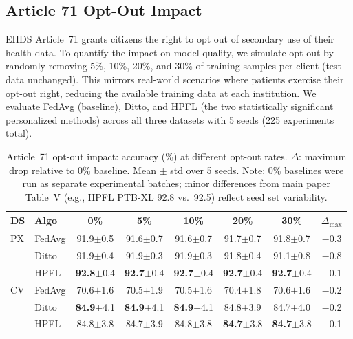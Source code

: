 \documentclass[conference]{IEEEtran}
\begin{document}
\subsection{Article 71 Opt-Out Impact}
\label{sec:optout}

EHDS Article~71 grants citizens the right to opt out of secondary use of their health data. To quantify the impact on model quality, we simulate opt-out by randomly removing 5\%, 10\%, 20\%, and 30\% of training samples per client (test data unchanged). This mirrors real-world scenarios where patients exercise their opt-out right, reducing the available training data at each institution. We evaluate FedAvg (baseline), Ditto, and HPFL (the two statistically significant personalized methods) across all three datasets with 5 seeds (225 experiments total).

\begin{table}[t]
\centering
\caption{Article~71 opt-out impact: accuracy (\%) at different opt-out rates. $\Delta$: maximum drop relative to 0\% baseline. Mean $\pm$ std over 5 seeds. Note: 0\% baselines were run as separate experimental batches; minor differences from main paper Table~V (e.g., HPFL PTB-XL 92.8 vs.\ 92.5) reflect seed set variability.}
\label{tab:optout}
\footnotesize
\begin{tabular}{ll ccccc c}
\toprule
\textbf{DS} & \textbf{Algo} & \textbf{0\%} & \textbf{5\%} & \textbf{10\%} & \textbf{20\%} & \textbf{30\%} & $\Delta_{\max}$ \\
\midrule
PX & FedAvg & 91.9{\tiny$\pm$0.5} & 91.6{\tiny$\pm$0.7} & 91.6{\tiny$\pm$0.7} & 91.7{\tiny$\pm$0.7} & 91.8{\tiny$\pm$0.7} & $-$0.3 \\
 & Ditto & 91.9{\tiny$\pm$0.4} & 91.9{\tiny$\pm$0.3} & 91.9{\tiny$\pm$0.3} & 91.8{\tiny$\pm$0.4} & 91.1{\tiny$\pm$0.8} & $-$0.8 \\
 & HPFL & \textbf{92.8}{\tiny$\pm$0.4} & \textbf{92.7}{\tiny$\pm$0.4} & \textbf{92.7}{\tiny$\pm$0.4} & \textbf{92.7}{\tiny$\pm$0.4} & \textbf{92.7}{\tiny$\pm$0.4} & $-$0.1 \\
\midrule
CV & FedAvg & 70.6{\tiny$\pm$1.6} & 70.5{\tiny$\pm$1.9} & 70.5{\tiny$\pm$1.6} & 70.4{\tiny$\pm$1.8} & 70.6{\tiny$\pm$1.6} & $-$0.2 \\
 & Ditto & \textbf{84.9}{\tiny$\pm$4.1} & \textbf{84.9}{\tiny$\pm$4.1} & \textbf{84.9}{\tiny$\pm$4.1} & 84.8{\tiny$\pm$3.9} & 84.7{\tiny$\pm$4.0} & $-$0.2 \\
 & HPFL & 84.8{\tiny$\pm$3.8} & 84.7{\tiny$\pm$3.9} & 84.8{\tiny$\pm$3.8} & \textbf{84.7}{\tiny$\pm$3.8} & \textbf{84.7}{\tiny$\pm$3.8} & $-$0.1 \\

\end{tabular}
\end{table}
\end{document}
